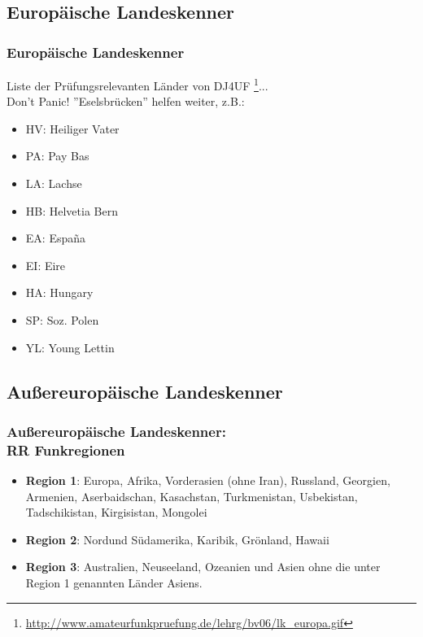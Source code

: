 \subsection{Europäische Landeskenner}

\begin{frame}
    \frametitle{Europäische Landeskenner}

    Liste der Prüfungsrelevanten Länder von DJ4UF
    \footnote{\scriptsize\url{http://www.amateurfunkpruefung.de/lehrg/bv06/lk_europa.gif}}... \\[2em]
    
    Don't Panic! ''Eselsbrücken'' helfen weiter, z.B.:
   
    \footnotesize
    \begin{itemize}
        \item HV: Heiliger Vater
        \item PA: Pay Bas
        \item LA: Lachse
        \item HB: Helvetia Bern
        \item EA: España
        \item EI: Eire
        \item HA: Hungary
        \item SP: Soz. Polen
        \item YL: Young Lettin
    \end{itemize}

\end{frame}

\subsection{Außereuropäische Landeskenner}

\begin{frame}
    \frametitle{Außereuropäische Landeskenner: \\ RR Funkregionen}


    \begin{itemize}
        \item \textbf{Region 1}: Europa, Afrika, Vorderasien (ohne Iran), Russland, Georgien,
              Armenien, Aserbaidschan, Kasachstan, Turkmenistan, Usbekistan,
              Tadschikistan, Kirgisistan, Mongolei
        \item \textbf{Region 2}: Nordund Südamerika, Karibik, Grönland, Hawaii
        \item \textbf{Region 3}: Australien, Neuseeland, Ozeanien und Asien ohne die unter
              Region 1 genannten Länder Asiens.
    \end{itemize}

\end{frame}

